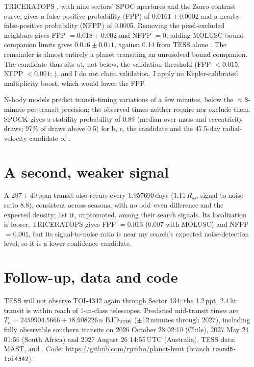 \documentclass{aastex701}
\begin{document}
TRICERATOPS \citep{2021AJ....161...24G}, with nine sectors' SPOC apertures and the Zorro contrast curve, gives a false-positive probability (FPP) of $0.0161\pm0.0002$ and a nearby-false-positive probability (NFPP) of 0.0005. Removing the pixel-excluded neighbors gives FPP $=0.018\pm0.002$ and NFPP $=0$; adding MOLUSC \citep{2021AJ....162..128W} bound-companion limits gives $0.016\pm0.011$, against 0.14 from TESS alone \citep{Eumemic2026}. The remainder is almost entirely a planet transiting an unresolved bound companion. The candidate thus sits at, not below, the validation threshold (FPP $<0.015$, NFPP $<0.001$; \citealt{2021AJ....161...24G}), and I do not claim validation. I apply no Kepler-calibrated multiplicity boost, which would lower the FPP.

N-body models predict transit-timing variations of a few minutes, below the $\approx$8-minute per-transit precision; the observed times neither require nor exclude them. SPOCK \citep{2020PNAS..11718194T} gives a stability probability of 0.89 (median over mass and eccentricity draws; 97\% of draws above 0.5) for b, c, the candidate and the 47.5-day radial-velocity candidate of \citet{2026A&A...708A..81P}.

\section{A second, weaker signal}

A $287\pm40$\,ppm transit also recurs every 1.957690\,days ($1.11\,R_\oplus$, signal-to-noise ratio 8.8), consistent across seasons, with no odd--even difference and the expected density; \citet{Eumemic2026} list it, unpromoted, among their search signals. Its localization is looser; TRICERATOPS gives FPP $=0.013$ (0.007 with MOLUSC) and NFPP $=0.001$, but its signal-to-noise ratio is near my search's expected noise-detection level, so it is a lower-confidence candidate.

\section{Follow-up, data and code}

TESS will not observe TOI-4342 again through Sector 134; the 1.2\,ppt, 2.4\,hr transit is within reach of 1-m-class telescopes. Predicted mid-transit times are $T_n=2459904.5666+18.908226\,n$ BJD$_{\rm TDB}$ ($\pm$12\,minutes through 2027), including fully observable southern transits on 2026 October 28 02:10 (Chile), 2027 May 24 01:56 (South Africa) and 2027 August 26 14:55\,UTC (Australia). TESS data: MAST,  and . Code: \url{https://github.com/rpinho/planet-hunt} (branch \texttt{round6-toi4342}).
\end{document}
